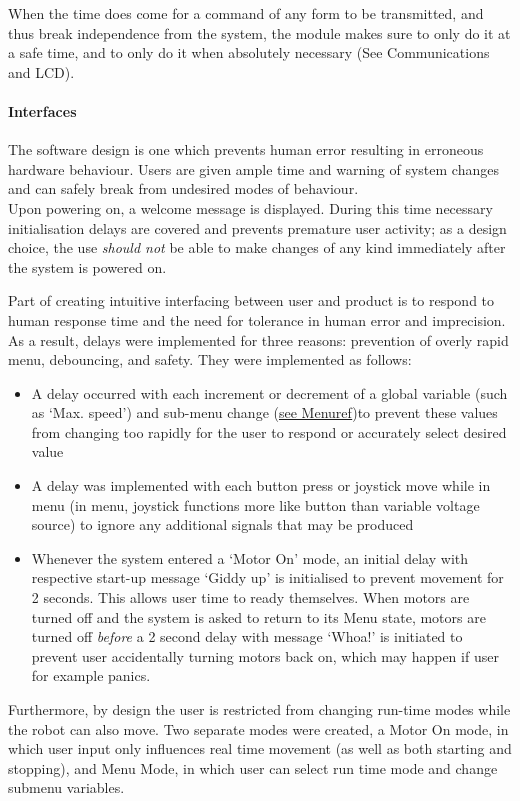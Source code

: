 \documentclass[MTRX3700report.tex]{subfiles}
\begin{document}
	When the time does come for a command of any form to be transmitted, and thus break independence from the system, the module makes sure to only do it at a safe time, and to only do it when absolutely necessary (See Communications and LCD).

	\paragraph{Interfaces}
	
	The software design is one which prevents human error resulting in erroneous hardware behaviour. Users are given ample time and warning of system changes and can safely break from undesired modes of behaviour.\\
	
	Upon powering on, a welcome message is displayed. During this time necessary initialisation delays are covered and prevents premature user activity; as a design choice, the use \textit{should not} be able to make changes of any kind immediately after the system is powered on.
	
	Part of creating intuitive interfacing between user and product is to respond to human response time and the need for tolerance in human error and imprecision. As a result, delays were implemented for three reasons: prevention of overly rapid menu, debouncing, and safety. They were implemented as follows:
	\begin{itemize}
		\item A delay occurred with each increment or decrement of a global variable (such as `Max. speed') and sub-menu change (\underline{see Menu\textunderscore ref})to prevent these values from changing too rapidly for the user to respond or accurately select desired value
		\item A delay was implemented with each button press or joystick move while in menu (in menu, joystick functions more like button than variable voltage source) to ignore any additional signals that may be produced
		\item Whenever the system entered a `Motor On' mode, an initial delay with respective start-up message `Giddy up' is initialised to prevent movement for 2 seconds. This allows user time to ready themselves. When motors are turned off and the system is asked to return to its Menu state, motors are turned off \textit{before} a 2 second delay with message `Whoa!' is initiated to prevent user accidentally turning motors back on, which may happen if user for example panics. 
	\end{itemize}
	Furthermore, by design the user is restricted from changing run-time modes while the robot can also move. Two separate modes were created, a Motor On mode, in which user input only influences real time movement (as well as both starting and stopping), and Menu Mode, in which user can select run time mode and change submenu variables.
	
\end{document}
